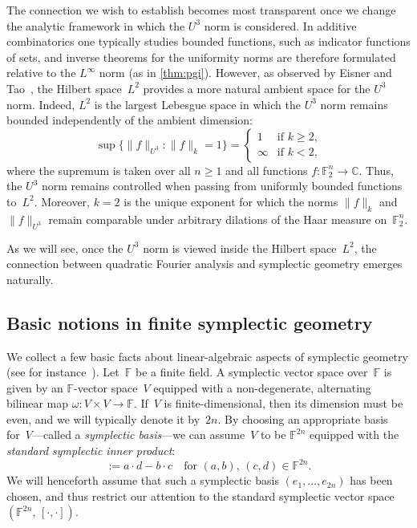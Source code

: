 \documentclass[11pt]{amsart}
\newcommand{\C}{\mathbb{C}} %
\newcommand{\F}{\mathbb{F}} %
\theoremstyle{plain}
\theoremstyle{definition}
\theoremstyle{remark}
\begin{document}
The connection we wish to establish becomes most transparent once we change the analytic framework in which the $U^3$ norm is considered. 
In additive combinatorics one typically studies bounded functions, such as indicator functions of sets, and inverse theorems for the uniformity norms are therefore formulated relative to the $L^\infty$ norm (as in \cref{thm:pgi}). 
However, as observed by Eisner and Tao~\cite{eisner2012large}, the Hilbert space~$L^2$ provides a more natural ambient space for the $U^3$ norm. Indeed, $L^2$ is the largest Lebesgue space in which the $U^3$ norm remains bounded independently of the ambient dimension:
\begin{equation}
    \sup\big\{\|f\|_{U^3} : \|f\|_{k}=1\big\}
    =
    \begin{cases}
        1 & \text{if $k\geq 2$,}\\
        \infty & \text{if $k<2$,}
    \end{cases}
\end{equation}
where the supremum is taken over all $n\geq 1$ and all functions $f: \F_2^n \to \C$.
Thus, the $U^3$ norm remains controlled when passing from uniformly bounded functions to~$L^2$. 
Moreover, $k=2$ is the unique exponent for which the norms $\|f\|_k$ and $\|f\|_{U^3}$ remain comparable under arbitrary dilations of the Haar measure on~$\F_2^n$.

As we will see, once the $U^3$ norm is viewed inside the Hilbert space~$L^2$, the connection between quadratic Fourier analysis and symplectic geometry emerges naturally.


\subsection{Basic notions in finite symplectic geometry}

We collect a few basic facts about linear-algebraic aspects of symplectic geometry (see for instance~\cite[Chapter~1]{Eslami_symp}).
Let~$\F$ be a finite field.
A symplectic vector space over~$\F$ is given by an $\F$-vector space~$V$ equipped with a non-degenerate, alternating bilinear map $\omega: V \times V \to \F$.
If~$V$ is finite-dimensional, then its dimension must be even, and we will typically denote it by~$2n$.
By choosing an appropriate basis for~$V$---called a \emph{symplectic basis}---we can assume~$V$ to be $\F^{2n}$ equipped with the \emph{standard symplectic inner product}:
\begin{equation*}
    [(a,b),\, (c,d)] := a\cdot d - b\cdot c \quad \text{for $(a,b),\, (c,d) \in \F^{2n}$.}
\end{equation*}
We will henceforth assume that such a symplectic basis $(e_1, \dots, e_{2n})$ has been chosen, and thus restrict our attention to the standard symplectic vector space $(\F^{2n},\, [\cdot, \cdot])$.
\end{document}
